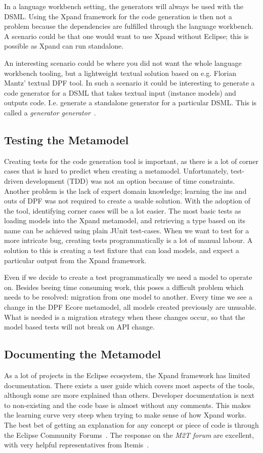 In a language workbench setting, the generators will always be used with the DSML. Using the Xpand framework for the code generation is then not a problem because the dependencies are fulfilled through the language workbench. A scenario could be that one would want to use Xpand without Eclipse; this is possible as Xpand can run standalone.

An interesting scenario could be where you did not want the whole language workbench tooling, but a lightweight textual solution based on e.g. Florian Mantz' textual DPF tool. In such a scenario it could be interesting to generate a code generator for a DSML that takes textual input (instance models) and outputs code. I.e. generate a standalone generator for a particular DSML. This is called a \emph{generator generator}~\cite{tolvanen:dsm}.

\subsection{Testing the Metamodel}\label{subsec:mm_test}
Creating tests for the code generation tool is important, as there is a lot of corner cases that is hard to predict when creating a metamodel. Unfortunately, test-driven development (TDD) was not an option because of time constraints. Another problem is the lack of expert domain knowledge; learning the ins and outs of DPF was not required to create a usable solution. With the adoption of the tool, identifying corner cases will be a lot easier. The most basic tests as loading models into the Xpand metamodel, and retrieving a type based on its name can be achieved using plain JUnit test-cases. When we want to test for a more intricate bug, creating tests programmatically is a lot of manual labour. A solution to this is creating a test fixture that can load models, and expect a particular output from the Xpand framework.

Even if we decide to create a test programmatically we need a model to operate on. Besides beeing time consuming work, this poses a difficult problem which needs to be resolved: migration from one model to another. Every time we see a change in the DPF Ecore metamodel, all models created previously are unusable. What is needed is a migration strategy when these changes occur, so that the model based tests will not break on API change.

\subsection{Documenting the Metamodel}
As a lot of projects in the Eclipse ecosystem, the Xpand framework has limited documentation. There exists a user guide which covers most aspects of the tools, although some are more explained than others. Developer documentation is next to non-existing and the code base is almost without any comments. This makes the learning curve very steep when trying to make sense of how Xpand works. The best bet of getting an explanation for any concept or piece of code is through the Eclipse Community Forums~\cite{eclipse_forums}. The response on the \emph{M2T forum} are excellent, with very helpful representatives from Itemis~\cite{itemis}.

